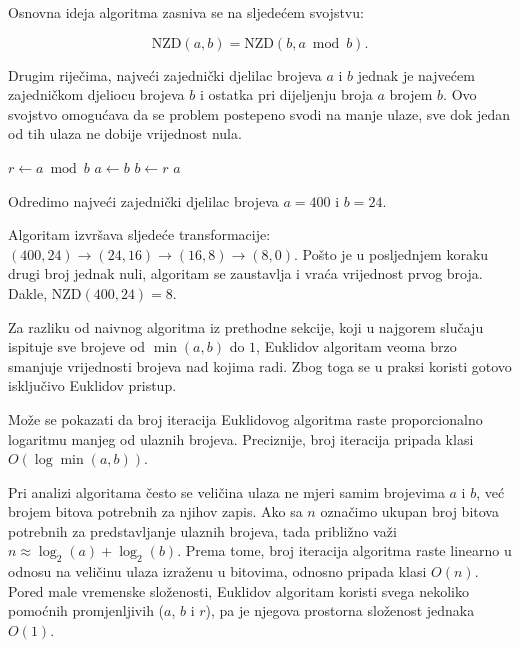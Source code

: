 Osnovna ideja algoritma zasniva se na sljedećem svojstvu:

$$\text{NZD}(a,b)=\text{NZD}(b,a\bmod b).$$

Drugim riječima, najveći zajednički djelilac brojeva $a$ i $b$ jednak je najvećem zajedničkom djeliocu brojeva $b$ i ostatka pri dijeljenju broja $a$ brojem $b$. Ovo svojstvo omogućava da se problem postepeno svodi na manje ulaze, sve dok jedan od tih ulaza ne dobije vrijednost nula.

\begin{algorithm}[H]
	\begin{algorithmic}[1]
		\State $r \gets a \bmod b$
		\State $a \gets b$
		\State $b \gets r$
		\EndWhile
		\State \Return $a$
		\EndProcedure
	\end{algorithmic}
	\caption{Euklidov algoritam.}
	\label{alg:nzd-euclid}
\end{algorithm}

\begin{example}
	
	Odredimo najveći zajednički djelilac brojeva 	$
	a=400$ i $b=24.$ 
\end{example}
	
	\begin{solution}
	Algoritam izvršava sljedeće transformacije: 	$
	(400,24)
	\rightarrow
	(24,16)
	\rightarrow
	(16,8)
	\rightarrow
	(8,0).
	$	Pošto je u posljednjem koraku drugi broj jednak nuli, algoritam se zaustavlja i vraća vrijednost prvog broja. Dakle, $\text{NZD}(400,24)=8.$
\end{solution}


Za razliku od naivnog algoritma iz prethodne sekcije, koji u najgorem slučaju ispituje sve brojeve od $\min(a,b)$ do $1$, Euklidov algoritam veoma brzo smanjuje vrijednosti brojeva nad kojima radi. Zbog toga se u praksi koristi gotovo isključivo Euklidov pristup.

Može se pokazati da broj iteracija Euklidovog algoritma raste proporcionalno logaritmu manjeg od ulaznih brojeva. Preciznije, broj iteracija pripada klasi $O(\log \min(a,b)).$

Pri analizi algoritama često se veličina ulaza ne mjeri samim brojevima $a$ i $b$, već brojem bitova potrebnih za njihov zapis. Ako sa $n$ označimo ukupan broj bitova potrebnih za predstavljanje ulaznih brojeva, tada približno važi $
n \approx \log_2(a)+\log_2(b).
$ Prema tome, broj iteracija algoritma raste linearno u odnosu na veličinu ulaza izraženu u bitovima, odnosno pripada klasi $O(n).
$ Pored male vremenske složenosti, Euklidov algoritam koristi svega nekoliko pomoćnih promjenljivih ($a$, $b$ i $r$), pa je njegova prostorna složenost jednaka $O(1).
$

